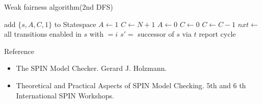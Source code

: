 \documentclass[12pt]{beamer}
\begin{document}
\begin{frame}[allowframebreaks]{Weak fairness algorithm(2nd DFS)}

\begin{algorithmic}
	\State add $\{s,A,C,1\}$ to Statespace
	 
			\State $A \gets 1$
			\State $C \gets N+1$
		\EndIf
	\Else
		 
			\State $A \gets 0$
			\State $C \gets 0$
		\EndIf
	\EndIf
		 
			\State $C \gets C - 1$
		\EndIf
		\State $nxt \gets$ all transitions enabled in $s$ with  $= i$
			\State $s' =$ successor of $s$ via $t$
			 
				\State report cycle
			\EndIf
		\EndFor
	\EndFor
\EndProcedure
\end{algorithmic}
\end{frame}

\begin{frame}{Reference}
\begin{itemize}
	\item The SPIN Model Checker. Gerard J. Holzmann.
	\item Theoretical and Practical Aspects of SPIN Model Checking. 5th and 6 th International SPIN Workshops.
\end{itemize}
\end{frame}
\end{document}
